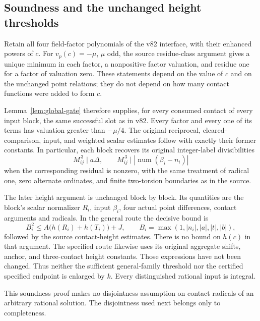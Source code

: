 \documentclass[11pt]{article}
\begin{document}
\subsection{Soundness and the unchanged height thresholds}

Retain all four field-factor polynomials of the v82
interface, with their enhanced powers of \(c\).
For \(v_p(c)=-\mu\), \(\mu\) odd, the source
residue-class argument gives a unique minimum in
each factor, a nonpositive factor valuation, and
residue one for a factor of valuation zero.
These statements depend on the value of \(c\)
and on the unchanged point relations; they
do not depend on how many contact functions
were added to form \(c\).

Lemma~\ref{lem:global-gate} therefore supplies,
for every consumed contact of every input block,
the same successful slot as in v82. Every
factor and every one of its terms has valuation
greater than \(-\mu/4\). The original reciprocal,
cleared-comparison, input, and weighted scalar
estimates follow with exactly their former
constants. In particular, each block recovers
its original integer-label divisibilities
\[
       M_{ij}^{\,3}\mid a\Delta,\qquad
       M_{ij}^{\,3}\mid
       \left|\operatorname{num}(\beta_i-n_i)\right|
\]
when the corresponding residual is nonzero,
with the same treatment of radical one,
zero alternate ordinates, and finite two-torsion
boundaries as in the source.

The later height argument is unchanged
block by block. Its quantities are the block's
scalar normalizer \(R_i\), input \(\beta_i\),
four actual point differences, contact
arguments and radicals. In the general route
the decisive bound is
\[
 B_i^2\le A\bigl(h(R_i)+h(T_i)\bigr)+J,
 \qquad
 B_i=\max(1,|n_i|,|a|,|t|,|b|),
\]
followed by the source contact-height estimates.
There is no bound on \(h(c)\) in that argument.
The specified route likewise uses its original
aggregate shifts, anchor, and three-contact
height constants. Those expressions have not
been changed. Thus neither the sufficient
general-family threshold nor the certified
specified endpoint is enlarged by \(k\).
Every distinguished rational input is integral.

This soundness proof makes no disjointness
assumption on contact radicals of an arbitrary
rational solution. The disjointness used next
belongs only to completeness.
\end{document}
